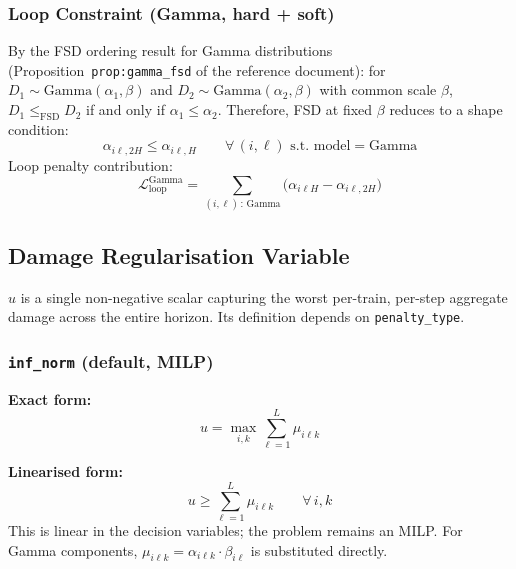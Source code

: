 \documentclass[11pt,a4paper]{article}
\begin{document}
\subsubsection{Loop Constraint (Gamma, hard + soft)}

By the FSD ordering result for Gamma distributions (Proposition~\texttt{prop:gamma\_fsd}
of the reference document): for $D_1 \sim \mathrm{Gamma}(\alpha_1, \beta)$ and
$D_2 \sim \mathrm{Gamma}(\alpha_2, \beta)$ with common scale $\beta$,
$D_1 \leq_{\mathrm{FSD}} D_2$ if and only if $\alpha_1 \leq \alpha_2$.
Therefore, FSD at fixed $\beta$ reduces to a shape condition:
\begin{equation}
  \alpha_{i\ell,2H} \leq \alpha_{i\ell,H}
  \qquad \forall\,(i,\ell)\text{ s.t. model} = \mathrm{Gamma}
\end{equation}
Loop penalty contribution:
\begin{equation}
  \mathcal{L}^{\mathrm{Gamma}}_{\mathrm{loop}} =
    \sum_{(i,\ell)\,:\,\mathrm{Gamma}} \bigl(\alpha_{i\ell H} - \alpha_{i\ell,2H}\bigr)
\end{equation}

\subsection{Damage Regularisation Variable}
\label{sec:objective}

$u$ is a single non-negative scalar capturing the worst per-train, per-step
aggregate damage across the entire horizon. Its definition depends on
\texttt{penalty\_type}.

\subsubsection{\texttt{inf\_norm} (default, MILP)}

\textbf{Exact form:}
\begin{equation}
  u = \max_{i,k} \sum_{\ell=1}^{L} \mu_{i\ell k}
\end{equation}

\textbf{Linearised form:}
\begin{equation}
  u \geq \sum_{\ell=1}^{L} \mu_{i\ell k} \qquad \forall\, i,k
\end{equation}
This is linear in the decision variables; the problem remains an MILP.
For Gamma components, $\mu_{i\ell k} = \alpha_{i\ell k}\cdot\beta_{i\ell}$
is substituted directly.
\end{document}
